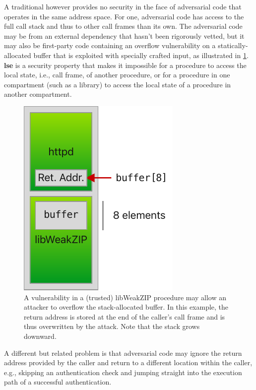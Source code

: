 \documentclass[main.tex]{subfiles}
\begin{document}
A traditional \cc{} however provides no security in the face of adversarial code that operates in the same address space. For one, adversarial code has access to the full call stack and thus to other call frames than its own. The adversarial code may be from an external dependency that hasn't been rigorously vetted, but it may also be first-party code containing an overflow vulnerability on a statically-allocated buffer that is exploited with specially crafted input, as illustrated in \cref{fig:buffoverflow}. \textbf{\Gls{lse}} is a security property that makes it impossible for a procedure to access the local state, i.e., call frame, of another procedure, or for a procedure in one compartment (such as a library) to access the local state of a procedure in another compartment.

\begin{figure}
	\begin{center}
		\includegraphics{Images/Buffer Overflow.pdf}
	\end{center}
	\caption{A vulnerability in a (trusted) libWeakZIP procedure may allow an attacker to overflow the stack-allocated buffer. In this example, the return address is stored at the end of the caller's call frame and is thus overwritten by the attack. Note that the stack grows downward.}
	\label{fig:buffoverflow}
\end{figure}

A different but related problem is that adversarial code may ignore the return address provided by the caller and return to a different location within the caller, e.g., skipping an authentication check and jumping straight into the execution path of a successful authentication.
\end{document}
